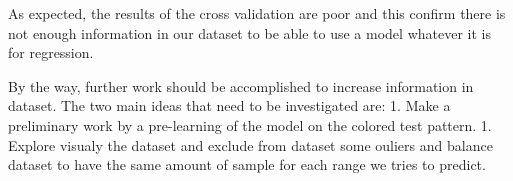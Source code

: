 \documentclass[11pt]{article}
\makeatletter
\newcommand{\boxspacing}{\kern\kvtcb@left@rule\kern\kvtcb@boxsep}
\newcommand{\prompt}[4]{
        {\ttfamily\llap{{\color{#2}[#3]:\hspace{3pt}#4}}\vspace{-\baselineskip}}
    }
\makeatother
\begin{document}
    As expected, the results of the cross validation are poor and this
confirm there is not enough information in our dataset to be able to use
a model whatever it is for regression.

By the way, further work should be accomplished to increase information
in dataset. The two main ideas that need to be investigated are: 1. Make
a preliminary work by a pre-learning of the model on the colored test
pattern. 1. Explore visualy the dataset and exclude from dataset some
ouliers and balance dataset to have the same amount of sample for each
range we tries to predict.

    \begin{tcolorbox}[breakable, size=fbox, boxrule=1pt, pad at break*=1mm,colback=cellbackground, colframe=cellborder]
\prompt{In}{incolor}{ }{\boxspacing}
\begin{Verbatim}[commandchars=\\\{\}]

\end{Verbatim}
\end{tcolorbox}


    
    
    
\end{document}
